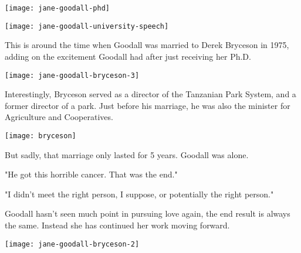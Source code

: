 \documentclass[12pt]{report}
\begin{document}
\texttt{[image: jane-goodall-phd]}

\texttt{[image: jane-goodall-university-speech]}

\pagebreak

This is around the time when Goodall was married to Derek Bryceson in 1975,
adding on the excitement Goodall had after just receiving her Ph.D.

\texttt{[image: jane-goodall-bryceson-3]}

Interestingly, Bryceson served as a director of the Tanzanian Park System, and
a former director of a park. Just before his marriage, he was also the minister
for Agriculture and Cooperatives.

\texttt{[image: bryceson]}

\pagebreak

But sadly, that marriage only lasted for 5 years. Goodall was alone.

"He got this horrible cancer. That was the end."

"I didn't meet the right person, I suppose, or potentially the right person."

Goodall hasn't seen much point in pursuing love again, the end result is always
the same. Instead she has continued her work moving forward.

\texttt{[image: jane-goodall-bryceson-2]}

\pagebreak
\end{document}
